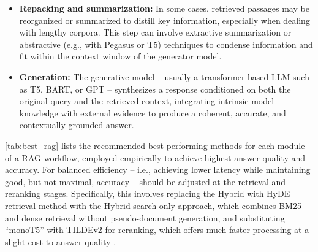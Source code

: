 \begin{spacing}{1.5}
\begin{itemize}
    \item \textbf{Repacking and summarization:} In some cases, retrieved passages may be reorganized or summarized to distill key information, especially when dealing with lengthy corpora. This step can involve extractive summarization or abstractive (e.g., with Pegasus or T5) techniques to condense information and fit within the context window of the generator model.
    \item \textbf{Generation:} The generative model -- usually a transformer-based LLM such as T5, BART, or GPT -- synthesizes a response conditioned on both the original query and the retrieved context, integrating intrinsic model knowledge with external evidence to produce a coherent, accurate, and contextually grounded answer.
\end{itemize}

\autoref{tab:best_rag} lists the recommended best-performing methods for each module of a RAG workflow, employed empirically to achieve highest answer quality and accuracy. For balanced efficiency -- i.e., achieving lower latency while maintaining good, but not maximal, accuracy -- should be adjusted at the retrieval and reranking stages. Specifically, this involves replacing the Hybrid with HyDE retrieval method with the Hybrid search-only approach, which combines BM25 and dense retrieval without pseudo-document generation, and substituting “monoT5” with TILDEv2 for reranking, which offers much faster processing at a slight cost to answer quality  \citep{wang_searching_2024}.


\end{spacing}
